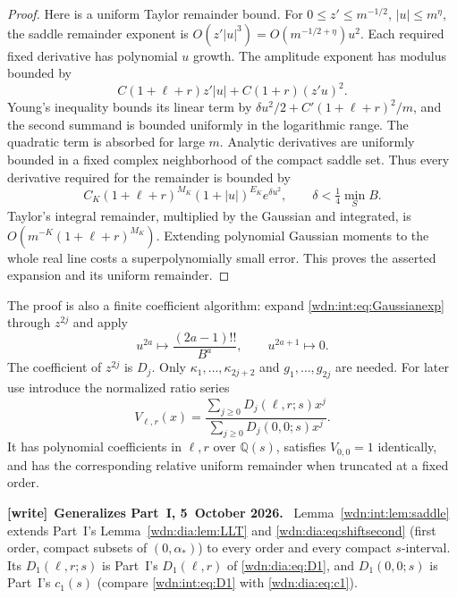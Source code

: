 \documentclass[11pt,letterpaper]{article}
\theoremstyle{remark}\newtheorem{remark}[theorem]{Remark}
\newcommand{\Q}{\mathbb Q}
\newenvironment{writenote}[1][]{\par\smallskip\begingroup\small
 \noindent\textbf{[write]}\if\relax\detokenize{#1}\relax\else~\textbf{#1.}\fi\ }%
 {\par\endgroup\smallskip}
\begin{document}
\begin{proof}
Here is a uniform Taylor remainder bound. For $0\le z'\le m^{-1/2}$,
$|u|\le m^\eta$, the saddle remainder exponent is
$O(z'|u|^3)=O(m^{-1/2+\eta})u^2$. Each required fixed derivative has
polynomial $u$ growth. The amplitude exponent has modulus bounded by
\[
 C(1+\ell+r)z'|u|+C(1+r)(z'u)^2.
\]
Young's inequality bounds its linear term by
$\delta u^2/2+C'(1+\ell+r)^2/m$, and the second summand is bounded
uniformly in the logarithmic range. The quadratic term is absorbed for
large $m$. Analytic derivatives are uniformly bounded in a fixed complex
neighborhood of the compact saddle set. Thus every derivative required
for the remainder is bounded by
\[
 C_K(1+\ell+r)^{M_K}(1+|u|)^{E_K}e^{\delta u^2},
 \qquad \delta<\tfrac14\min_S B.
\]
Taylor's integral remainder, multiplied by the Gaussian and integrated,
is $O(m^{-K}(1+\ell+r)^{M_K})$. Extending polynomial Gaussian moments
to the whole real line costs a superpolynomially small error. This proves
the asserted expansion and its uniform remainder.
\end{proof}

The proof is also a finite coefficient algorithm: expand
\eqref{wdn:int:eq:Gaussianexp} through $z^{2j}$ and apply
\begin{equation}\label{wdn:int:eq:Gaussianmoments}
 u^{2a}\longmapsto\frac{(2a-1)!!}{B^a},\qquad
 u^{2a+1}\longmapsto0.
\end{equation}
The coefficient of $z^{2j}$ is $D_j$. Only
$\kappa_1,\ldots,\kappa_{2j+2}$ and $g_1,\ldots,g_{2j}$ are needed.
For later use introduce the normalized ratio series
\begin{equation}\label{wdn:int:eq:V}
 V_{\ell,r}(x)=
 \frac{\sum_{j\ge0}D_j(\ell,r;s)x^j}
      {\sum_{j\ge0}D_j(0,0;s)x^j}.
\end{equation}
It has polynomial coefficients in $\ell,r$ over $\Q(s)$, satisfies
$V_{0,0}=1$ identically, and has the corresponding relative uniform
remainder when truncated at a fixed order.

\begin{writenote}[Generalizes Part~I, 5~October 2026]
Lemma~\ref{wdn:int:lem:saddle} extends Part~I's Lemma~\ref{wdn:dia:lem:LLT} and \eqref{wdn:dia:eq:shiftsecond} (first order, compact subsets of $(0,\alpha_*)$) to every order and every compact $s$-interval. Its $D_1(\ell,r;s)$ is Part~I's $D_1(\ell,r)$ of \eqref{wdn:dia:eq:D1}, and $D_1(0,0;s)$ is Part~I's $c_1(s)$ (compare \eqref{wdn:int:eq:D1} with \eqref{wdn:dia:eq:c1}).
\end{writenote}
\end{document}

